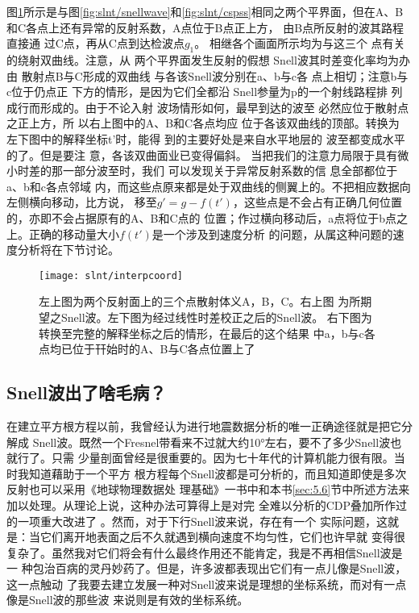 图\ref{fig:slnt/interpcoord}所示是与图\ref{fig:slnt/snellwave}和\ref{fig:slnt/cspss}相同之两个平界面，但在A、B和C各点上还有异常的反射系数，A点位于B点正上方，
由B点所反射的波其路程直接通
过C点，再从C点到达检波点$g_1$。 
相继各个画面所示均为与这三个
点有关的绕射双曲线。注意，从
两个平界面发生反射的假想
Snell波其时差变化率均为办由 
散射点B与C形成的双曲线
与各该Snell波分别在a、b与c各 
点上相切；注意b与c位于仍点正
下方的情形，是因为它们全都沿 
Snell参量为p的一个射线路程排
列成行而形成的。由于不论入射 
波场情形如何，最早到达的波至
必然应位于散射点之正上方，所 
以右上图中的A、B和C各点均应
位于各该双曲线的顶部。转换为 
左下图中的解释坐标t'时，能得
到的主要好处是来自水平地层的 
波至都变成水平的了。但是要注
意，各该双曲面业已变得偏斜。
当把我们的注意力局限于具有微
小时差的那一部分波至时，我们
可以发现关于异常反射系数的信
息全部都位于a、b和c各点邻域
内，而这些点原来都是处于双曲线的侧翼上的。不把相应数据向左侧横向移动，比方说，
移至$g'=g-f(t')$，这些点是不会占有正确几何位置的，亦即不会占据原有的A、B和C点的
位置；作过横向移动后，a点将位于b点之上。正确的移动量大小$f(t')$是一个涉及到速度分析
的问题，从属这种问题的速度分析将在下节讨论。

\begin{figure}[H]
\centering
\texttt{[image: slnt/interpcoord]}
\caption[interpcoord]{左上图为两个反射面上的三个点散射体义A，B，C。右上图
为所期望之Snell波。左下图为经过线性时差校正之后的Snell波。
右下图为转换至完整的解释坐标之后的情形，在最后的这个结果
中a，b与c各点均已位于幵始时的A、B与C各点位置上了
}
\label{fig:slnt/interpcoord}
\end{figure}

\subsection{Snell波出了啥毛病？}
\label{sec:5.3.4}

在建立平方根方程以前，我曾经认为进行地震数据分析的唯一正确途径就是把它分解成
Snell波。既然一个Fresnel带看来不过就大约10°左右，要不了多少Snell波也就行了。只需
少量剖面曾经是很重要的。因为七十年代的计算机能力很有限。当时我知道藉助于一个平方
根方程每个Snell波都是可分析的，而且知道即使是多次反射也可以采用《地球物理数据处
理基础》一书中和本书\ref{sec:5.6}节中所述方法来加以处理。从理论上说，这种办法可算得上是对完
全难以分析的CDP叠加所作过的一项重大改进了
。然而，对于下行Snell波来说，存在有一个
实际问题，这就是：当它们离开地表面之后不久就遇到横向速度不均匀性，它们也许早就
变得很复杂了。虽然我对它们将会有什么最终作用还不能肯定，我是不再相信Snell波是一
种包治百病的灵丹妙药了。但是，许多波都表现出它们有一点儿像是Snell波，这一点触动
了我要去建立发展一种对Snell波来说是理想的坐标系统，而对有一点像是Snell波的那些波
来说则是有效的坐标系统。

